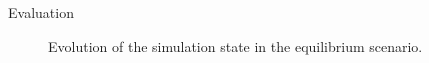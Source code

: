 \begin{frame}[c]{Evaluation}{}
{\begin{figure}[htpb]
\begin{subfigure}[c]{.25\textwidth}
			\end{subfigure}%
			\begin{subfigure}[c]{.08\textwidth}
				\fastcolorbar
			\end{subfigure}
			\vspace{-0.3cm}
			\caption{Evolution of the simulation state in the equilibrium scenario.}
			\label{fig:evolution_equil}
		\end{figure}
	}
\end{frame}
